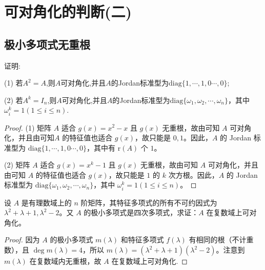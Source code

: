 \documentclass[../../main.tex]{subfiles}
\begin{document}
\section{可对角化的判断(二)}

\subsection{极小多项式无重根}

\begin{proposition}\label{example:幂等和对合矩阵的Jordan标准型}
证明:

(1) 若$A^2 = A$,则$A$可对角化,并且$A$的Jordan标准型为$\mathrm{diag}\{1,\cdots,1,0\cdots,0\}$;

(2) 若$A^k = I_n$,则$A$可对角化,并且$A$的Jordan标准型为$\mathrm{diag}\{\omega_1,\omega_2,\cdots,\omega_n\}$，其中 $\omega_i^k = 1 (1\leq i\leq n)$.
\end{proposition}
\begin{proof}
(1) 矩阵 $A$ 适合 $g(x)=x^2 - x$ 且 $g(x)$ 无重根，故由可知 $A$ 可对角化，并且由可知$A$ 的特征值也适合 $g(x)$，故只能是 $0,1$。因此，$A$ 的 Jordan 标准型为 $\mathrm{diag}\{1,\cdots,1,0\cdots,0\}$，其中有 $\mathrm{r}(A)$ 个 $1$。

(2) 矩阵 $A$ 适合 $g(x)=x^k - 1$ 且 $g(x)$ 无重根，故由可知 $A$ 可对角化，并且由可知 $A$ 的特征值也适合 $g(x)$，故只能是 $1$ 的 $k$ 次方根。因此，$A$ 的 Jordan 标准型为 $\mathrm{diag}\{\omega_1,\omega_2,\cdots,\omega_n\}$，其中 $\omega_i^k = 1 (1\leq i\leq n)$。
\end{proof}

\begin{example}
设 $A$ 是有理数域上的 $n$ 阶矩阵，其特征多项式的所有不可约因式为 $\lambda^2 + \lambda + 1,\lambda^2 - 2$。又 $A$ 的极小多项式是四次多项式，求证：$A$ 在复数域上可对角化。
\end{example}
\begin{proof}
因为 $A$ 的极小多项式 $m(\lambda)$ 和特征多项式 $f(\lambda)$ 有相同的根（不计重数），且 $\deg m(\lambda)=4$，所以 $m(\lambda)=(\lambda^2 + \lambda + 1)(\lambda^2 - 2)$。注意到 $m(\lambda)$ 在复数域内无重根，故 $A$ 在复数域上可对角化.
\end{proof}
\end{document}
